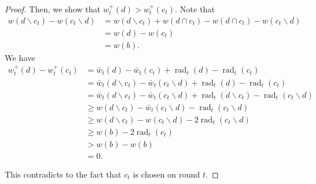 \documentclass{article}
\newcommand{\del}{\backslash}
\DeclareMathOperator{\rad}{rad}
\begin{document}
\begin{spacing}{1.1}
\begin{proof}
Then, we show that $w^+_t(d) > w^+_t(c_t)$.
Note that
\begin{align}
w(d\del c_t)-w(c_t\del d) &= w(d\del c_t)+w(d\cap c_t)-w(d\cap c_t)-w(c_t\del d)\\
						  &= w(d)-w(c_t) \\
						  &= w(b).
\end{align}
We have
\begin{align}
w^+_t(d)-w^+_t(c_t) &= \bar w_t(d)-\bar w_t(c_t)+\rad_t(d)-\rad_t(c_t)\\
					&= \bar w_t(d\del c_t)-\bar w_t(c_t\del d)+\rad_t(d)-\rad_t(c_t)\\
					&= \bar w_t(d\del c_t)-\bar w_t(c_t\del d)+\rad_t(d \del c_t)-\rad_t(c_t \del d)\\
					&\ge w(d\del c_t)-\bar w_t(c_t \del d)-\rad_t(c_t \del d)\\
					&\ge w(d\del c_t)-w(c_t \del d)-2\rad_t(c_t \del d)\\
					&\ge w(b)-2\rad_t(c_t) \\
					&> w(b)-w(b)\\
					&= 0.
\end{align}

This contradicts to the fact that $c_t$ is chosen on round $t$.
\end{proof}


%
%
\end{spacing}
\end{document}
